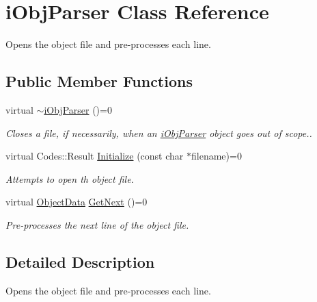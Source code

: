 \hypertarget{classiObjParser}{
\section{iObjParser Class Reference}
\label{classiObjParser}
}


Opens the object file and pre-\/processes each line.  


\subsection*{Public Member Functions}
\begin{DoxyCompactItemize}
\item 
\hypertarget{classiObjParser_ae88aacaa19a6aa6d4a7c82c02eabc3dc}{
virtual \hyperlink{classiObjParser_ae88aacaa19a6aa6d4a7c82c02eabc3dc}{$\sim$iObjParser} ()=0}
\label{classiObjParser_ae88aacaa19a6aa6d4a7c82c02eabc3dc}

\begin{DoxyCompactList}\small\item\em Closes a file, if necessarily, when an \hyperlink{classiObjParser}{iObjParser} object goes out of scope.. \item\end{DoxyCompactList}\item 
virtual Codes::Result \hyperlink{classiObjParser_a570e7a7dfb64b66e7a78f75ec4da193a}{Initialize} (const char $\ast$filename)=0
\begin{DoxyCompactList}\small\item\em Attempts to open th object file. \item\end{DoxyCompactList}\item 
virtual \hyperlink{structObjectData}{ObjectData} \hyperlink{classiObjParser_aeb9af4a40a06e755d8b0e493526d82dd}{GetNext} ()=0
\begin{DoxyCompactList}\small\item\em Pre-\/processes the next line of the object file. \item\end{DoxyCompactList}\end{DoxyCompactItemize}


\subsection{Detailed Description}
Opens the object file and pre-\/processes each line. 

